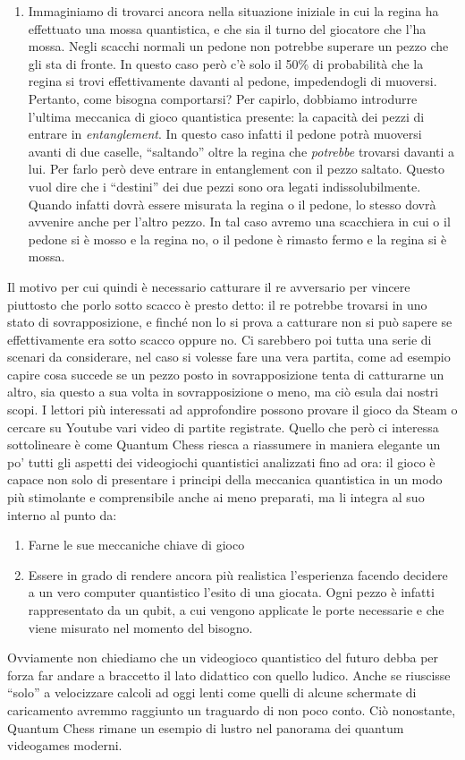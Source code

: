 \documentclass{book}
\theoremstyle{definition}
\theoremstyle{definition}
\theoremstyle{definition}
\theoremstyle{plain}
\theoremstyle{plain}
\theoremstyle{plain}
\theoremstyle{plain}
\begin{document}
\begin{enumerate}
    \item Immaginiamo di trovarci ancora nella situazione iniziale in cui la regina ha effettuato una mossa quantistica, e che sia il turno del giocatore che l'ha mossa. Negli scacchi normali un pedone non potrebbe superare un pezzo che gli sta di fronte. In questo caso però c'è solo il 50\% di probabilità che la regina si trovi effettivamente davanti al pedone, impedendogli di muoversi. Pertanto, come bisogna comportarsi? Per capirlo, dobbiamo introdurre l'ultima meccanica di gioco quantistica presente: la capacità dei pezzi di entrare in \emph{entanglement}. In questo caso infatti il pedone potrà muoversi avanti di due caselle, ``saltando'' oltre la regina che \emph{potrebbe} trovarsi davanti a lui. Per farlo però deve entrare in entanglement con il pezzo saltato. Questo vuol dire che i ``destini'' dei due pezzi sono ora legati indissolubilmente. Quando infatti dovrà essere misurata la regina o il pedone, lo stesso dovrà avvenire anche per l'altro pezzo. In tal caso avremo una scacchiera in cui o il pedone si è mosso e la regina no, o il pedone è rimasto fermo e la regina si è mossa.
\end{enumerate}
Il motivo per cui quindi è necessario catturare il re avversario per vincere piuttosto che porlo sotto scacco è presto detto: il re potrebbe trovarsi in uno stato di sovrapposizione, e finché non lo si prova a catturare non si può sapere se effettivamente era sotto scacco oppure no. Ci sarebbero poi tutta una serie di scenari da considerare, nel caso si volesse fare una vera partita, come ad esempio capire cosa succede se un pezzo posto in sovrapposizione tenta di catturarne un altro, sia questo a sua volta in sovrapposizione o meno, ma ciò esula dai nostri scopi. I lettori più interessati ad approfondire possono provare il gioco da Steam o cercare su Youtube vari video di partite registrate. Quello che però ci interessa sottolineare è come Quantum Chess riesca a riassumere in maniera elegante un po' tutti gli aspetti dei videogiochi quantistici analizzati fino ad ora: il gioco è capace non solo di presentare i principi della meccanica quantistica in un modo più stimolante e comprensibile anche ai meno preparati, ma li integra al suo interno al punto da:
\begin{enumerate}
    \item Farne le sue meccaniche chiave di gioco
    \item Essere in grado di rendere ancora più realistica l'esperienza facendo decidere a un vero computer quantistico l'esito di una giocata. Ogni pezzo è infatti rappresentato da un qubit, a cui vengono applicate le porte necessarie e che viene misurato nel momento del bisogno.
\end{enumerate}
Ovviamente non chiediamo che un videogioco quantistico del futuro debba per forza far andare a braccetto il lato didattico con quello ludico. Anche se riuscisse ``solo'' a velocizzare calcoli ad oggi lenti come quelli di alcune schermate di caricamento avremmo raggiunto un traguardo di non poco conto. Ciò nonostante, Quantum Chess rimane un esempio di lustro nel panorama dei quantum videogames moderni.
\end{document}
